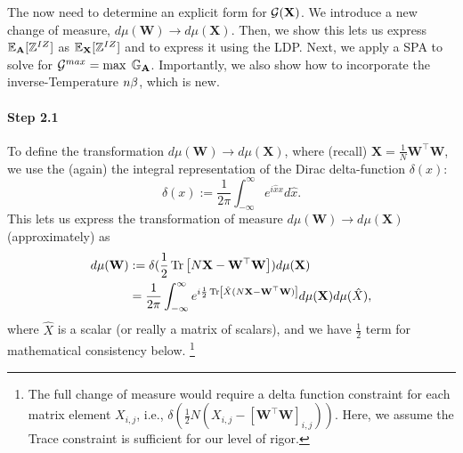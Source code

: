The now need to determine an explicit form for
$\mathcal{G}(\mathbf{X})$. We introduce a new change of measure, 
 $d\mu(\mathbf{W})\rightarrow d\mu(\mathbf{X})$.
Then, we show this lets us express $\mathbb{E}_{\mathbf{A}}[\mathbb{Z}^{IZ}]$ as $\mathbb{E}_{\mathbf{X}}[\mathbb{Z}^{IZ}]$ and to express it using the LDP.
Next, we apply a SPA to solve for $\mathcal{G}^{max}=\max\;\mathbb{G}_{\mathbf{A}}$.
Importantly, we also show how to incorporate the inverse-Temperature $n\beta$,
which is new.

\paragraph{Step 2.1}
To define the transformation $d\mu(\mathbf{W})\rightarrow d\mu(\mathbf{X})$,  where (recall) $\mathbf{X}=\frac{1}{N}\mathbf{W}^{\top}\mathbf{W}$,
we use the (again) the integral representation of the Dirac delta-function $\delta(x)$:
\begin{equation}
  \label{eqn:dirac}
  \delta(x):=\frac{1}{2\pi}\int_{-\infty}^{\infty} e^{i\hat{x}x} d\hat{x}.
\end{equation}
%
This lets us express the transformation of measure $d\mu(\mathbf{W})\rightarrow d\mu(\mathbf{X})$
(approximately) as
\begin{align}
\nonumber
  d\mu(\mathbf{W}) &:= \delta(\frac{1}{2}\mbox{}\operatorname{Tr}\left[N\mathbf{X}-\mathbf{W}^{\top}\mathbf{W}\right]) d\mu(\mathbf{X}) \\ 
  &= \frac{1}{2\pi}\int_{-\infty}^{\infty} e^{i\frac{1}{2}
    \mbox{}\operatorname{Tr}\left[\hat{X}(N\mathbf{X}-\mathbf{W}^{\top}\mathbf{W})\right]
  }
  d\mu(\mathbf{X})d\mu(\hat{X} ),
\end{align}
where $\hat{X}$ is a scalar (or really a matrix of scalars),
and we have 
$\frac{1}{2}$
term for mathematical consistency below.
\footnote{The full change of measure would require a delta function constraint
for each matrix element $X_{i,j}$, i.e., 
$\delta\left(\frac{1}{2}N\left(X_{i,j}-[\mathbf{W}^{\top}\mathbf{W}]_{i,j}\right)\right)$.
Here, we assume the Trace constraint is sufficient for our level of rigor.
}



